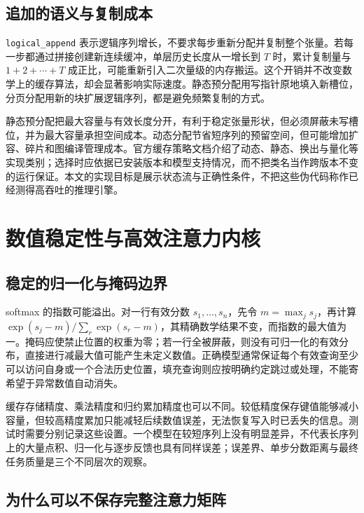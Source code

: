 \documentclass[UTF8,12pt,a4paper,fontset=fandol]{ctexart}
\begin{document}
\subsection{追加的语义与复制成本}

\texttt{logical\_append} 表示逻辑序列增长，不要求每步重新分配并复制整个张量。若每一步都通过拼接创建新连续缓冲，单层历史长度从一增长到 $T$ 时，累计复制量与 $1+2+\cdots+T$ 成正比，可能重新引入二次量级的内存搬运。这个开销并不改变数学上的缓存算法，却会显著影响实际速度。静态预分配用写指针原地填入新槽位，分页分配用新的块扩展逻辑序列，都是避免频繁复制的方式。

静态预分配把最大容量与有效长度分开，有利于稳定张量形状，但必须屏蔽未写槽位，并为最大容量承担空间成本。动态分配节省短序列的预留空间，但可能增加扩容、碎片和图编译管理成本。官方缓存策略文档介绍了动态、静态、换出与量化等实现类别\cite{hf-strategies}；选择时应依据已安装版本和模型支持情况，而不把类名当作跨版本不变的运行保证。本文的实现目标是展示状态流与正确性条件，不把这些伪代码称作已经测得高吞吐的推理引擎。

\section{数值稳定性与高效注意力内核}
\label{sec:kv-numerics}

\subsection{稳定的归一化与掩码边界}

softmax 的指数可能溢出。对一行有效分数 $s_1,\ldots,s_n$，先令 $m=\max_j s_j$，再计算 $\exp(s_j-m)/\sum_r\exp(s_r-m)$，其精确数学结果不变，而指数的最大值为一。掩码应使禁止位置的权重为零；若一行全被屏蔽，则没有可归一化的有效分布，直接进行减最大值可能产生未定义数值。正确模型通常保证每个有效查询至少可以访问自身或一个合法历史位置，填充查询则应按明确约定跳过或处理，不能寄希望于异常数值自动消失。

缓存存储精度、乘法精度和归约累加精度也可以不同。较低精度保存键值能够减小容量，但较高精度累加只能减轻后续数值误差，无法恢复写入时已丢失的信息。测试时需要分别记录这些设置。一个模型在较短序列上没有明显差异，不代表长序列上的大量点积、归一化与逐步反馈也具有同样误差；误差界、单步分数距离与最终任务质量是三个不同层次的观察。

\subsection{为什么可以不保存完整注意力矩阵}
\end{document}

